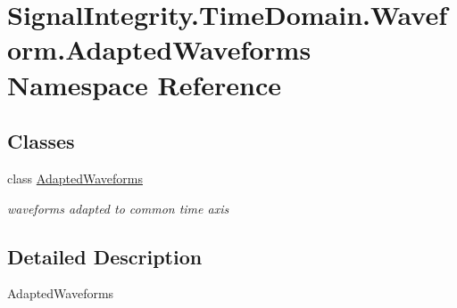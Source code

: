 \hypertarget{namespaceSignalIntegrity_1_1TimeDomain_1_1Waveform_1_1AdaptedWaveforms}{}\section{Signal\+Integrity.\+Time\+Domain.\+Waveform.\+Adapted\+Waveforms Namespace Reference}
\label{namespaceSignalIntegrity_1_1TimeDomain_1_1Waveform_1_1AdaptedWaveforms}
\subsection*{Classes}
\begin{DoxyCompactItemize}
\item 
class \hyperlink{classSignalIntegrity_1_1TimeDomain_1_1Waveform_1_1AdaptedWaveforms_1_1AdaptedWaveforms}{Adapted\+Waveforms}
\begin{DoxyCompactList}\small\item\em waveforms adapted to common time axis \end{DoxyCompactList}\end{DoxyCompactItemize}


\subsection{Detailed Description}
\begin{DoxyVerb}AdaptedWaveforms\end{DoxyVerb}
 
